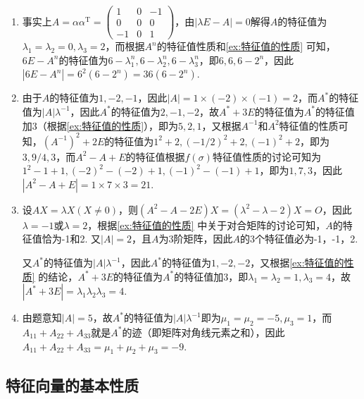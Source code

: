 \begin{solution}
    \begin{enumerate}
        \item 事实上$A=\alpha\alpha^\mathrm{T}=\begin{pmatrix}
                      1 & 0 & -1 \\ 0 & 0 & 0 \\ -1 & 0 & 1
                  \end{pmatrix}$，由$|\lambda E-A|=0$解得$A$的特征值为$\lambda_1=\lambda_2=0,\lambda_3=2$，而根据$A^n$的特征值性质和\autoref{ex:特征值的性质} 可知，$6E-A^n$的特征值为$6-\lambda_1^n,6-\lambda_2^n,6-\lambda_3^n$，即$6,6,6-2^n$，因此$|6E-A^n|=6^2(6-2^n)=36(6-2^n)$.

        \item 由于$A$的特征值为$1,-2,-1$，因此$|A|=1\times(-2)\times(-1)=2$，而$A^*$的特征值为$|A|\lambda^{-1}$，因此$A^*$的特征值为$2,-1,-2$，故$A^*+3E$的特征值为$A^*$的特征值加3（根据\autoref{ex:特征值的性质}），即为$5,2,1$，又根据$A^{-1}$和$A^2$特征值的性质可知，$(A^{-1})^2+2E$的特征值为$1^2+2,(-1/2)^2+2,(-1)^2+2$，即为$3,9/4,3$，而$A^2-A+E$的特征值根据$f(\sigma)$特征值性质的讨论可知为$1^2-1+1,(-2)^2-(-2)+1,(-1)^2-(-1)+1$，即为$1,7,3$，因此$|A^2-A+E|=1\times 7\times 3=21$.

        \item 设$AX=\lambda X(X\neq 0)$，则$(A^2-A-2E)X=(\lambda^2-\lambda-2)X=O$，因此$\lambda=-1$或$\lambda=2$，根据\autoref{ex:特征值的性质} 中关于对合矩阵的讨论可知，$A$的特征值恰为-1和2. 又$|A|=2$，且$A$为3阶矩阵，因此$A$的3个特征值必为-1，-1，2.

              又$A^*$的特征值为$|A|\lambda^{-1}$，因此$A^*$的特征值为$1,-2,-2$，又根据\autoref{ex:特征值的性质} 的结论，$A^*+3E$的特征值为$A^*$的特征值加3，即$\lambda_1=\lambda_2=1,\lambda_3=4$，故$|A^*+3E|=\lambda_1\lambda_2\lambda_3=4$.

        \item 由题意知$|A|=5$，故$A^*$的特征值为$|A|\lambda^{-1}$即为$\mu_1=\mu_2=-5,\mu_3=1$，而$A_{11}+A_{22}+A_{33}$就是$A^*$的迹（即矩阵对角线元素之和），因此$A_{11}+A_{22}+A_{33}=\mu_1+\mu_2+\mu_3=-9$.
    \end{enumerate}
\end{solution}

\subsection{特征向量的基本性质}

